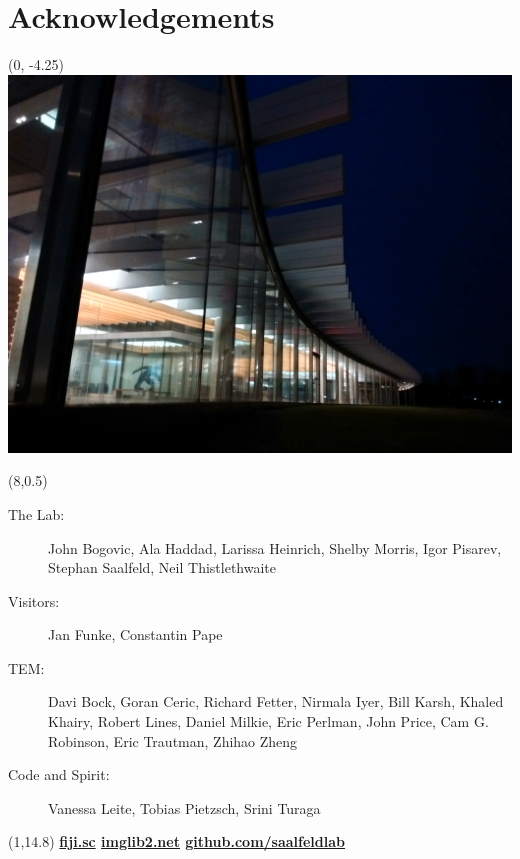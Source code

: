 \documentclass[aspectratio=169,table]{beamer}
\begin{document}
\section{Acknowledgements}
\begin{frame}
    \begin{textblock}{16}(0, -4.25) 
        \includegraphics[width=\textwidth]{fig/janelia.jpg}
    \end{textblock}%
    \begin{textblock}{7.8}(8,0.5)
        \scriptsize%
        \begin{description}
              \item[The Lab:]{John Bogovic, Ala Haddad, Larissa Heinrich, Shelby Morris, Igor Pisarev, Stephan Saalfeld, Neil Thistlethwaite}
              \item[Visitors:]{Jan Funke, Constantin Pape}
              \item[TEM:]{Davi Bock, Goran Ceric, Richard Fetter, Nirmala Iyer, Bill Karsh, Khaled Khairy, Robert Lines, Daniel Milkie, Eric Perlman, John Price, Cam G. Robinson, Eric Trautman, Zhihao Zheng}
              \item[Code and Spirit:]{Vanessa Leite, Tobias Pietzsch, Srini Turaga}
        \end{description}
    \end{textblock}

    \begin{textblock}{14}(1,14.8)
        \large\bf
        \href{http://fiji.sc}{fiji.sc} \hspace{2cm} \href{http://imglib2.net}{imglib2.net} \hspace{2cm} \href{https://github.com/saalfeldlab}{github.com/saalfeldlab} 
    \end{textblock}



\end{frame}
\end{document}
